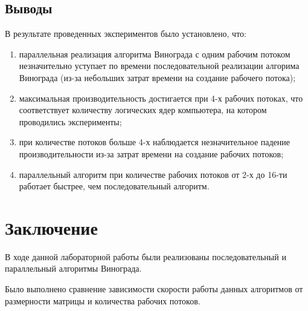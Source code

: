 \documentclass[a4paper,14pt]{report}
\begin{document}
\newpage

\section*{Выводы}

В результате проведенных экспериментов было установлено, что:

\begin{enumerate}
	\item параллельная реализация алгоритма Винограда с одним рабочим потоком незначительно уступает по времени последовательной реализации алгорима Винограда (из-за небольших затрат времени на создание рабочего потока);
	\item максимальная производительность достигается при 4-х рабочих потоках, что соответствует количеству логических ядер компьютера, на котором проводились эксперименты;
	\item при количестве потоков больше 4-х наблюдается незначительное падение производительности из-за затрат времени на создание рабочих потоков;
	\item параллельный алгоритм при количестве рабочих потоков от 2-х до 16-ти работает быстрее, чем последовательный алгоритм.
\end{enumerate}


\chapter*{Заключение}

В ходе данной лабораторной работы были реализованы последовательный и параллельный алгоритмы Винограда.

Было выполнено сравнение зависимости скорости работы данных алгоритмов от размерности матрицы и количества рабочих потоков.
\end{document}
